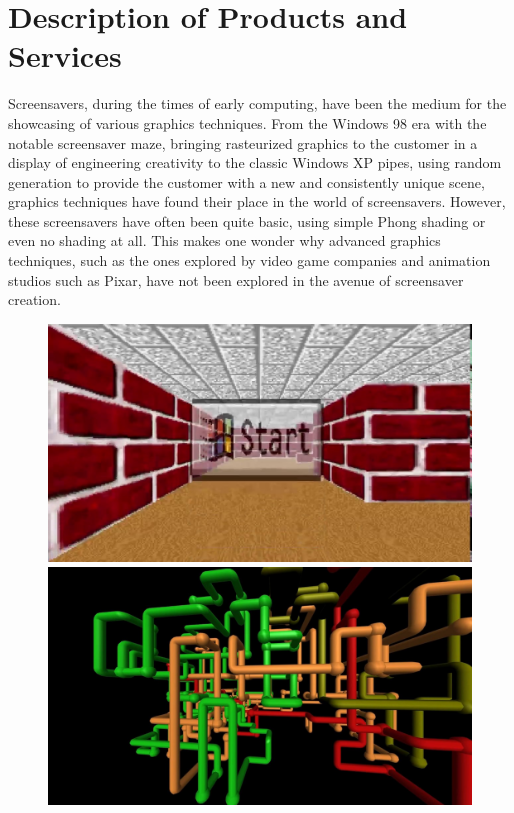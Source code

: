 \documentclass[10pt, openany]{book}
\begin{document}
\section{Description of Products and Services}

Screensavers, during the times of early computing, have been the medium for the showcasing of various graphics techniques. From the Windows 98 era with the notable screensaver maze, bringing rasteurized graphics to the customer in a display of engineering creativity to the classic Windows XP pipes, using random generation to provide the customer with a new and consistently unique scene, graphics techniques have found their place in the world of screensavers. However, these screensavers have often been quite basic, using simple Phong shading or even no shading at all. This makes one wonder why advanced graphics techniques, such as the ones explored by video game companies and animation studios such as Pixar, have not been explored in the avenue of screensaver creation. 

\begin{figure}[H]
\centering
\begin{minipage}{.5\textwidth}
  \centering
  \includegraphics[width=.6\linewidth]{maze}
\end{minipage}%
\begin{minipage}{.5\textwidth}
  \centering
  \includegraphics[width=.6\linewidth]{pipes}
\end{minipage}
\end{figure}	
\end{document}
